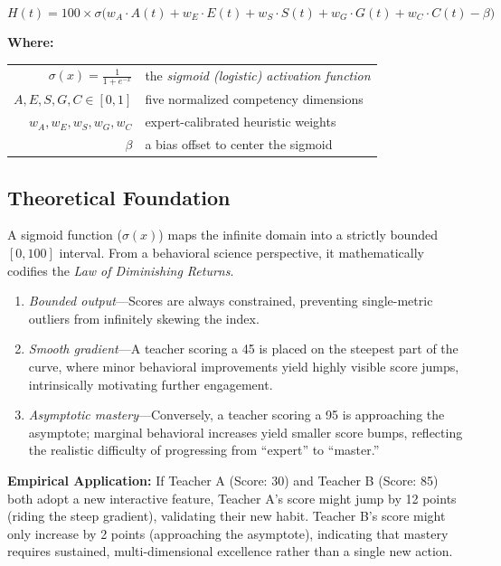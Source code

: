 \documentclass[11pt,a4paper]{article}
\begin{document}
\begin{equation}
    H(t) = 100 \times \sigma\bigl(w_A \cdot A(t) + w_E \cdot E(t) + w_S \cdot S(t) + w_G \cdot G(t) + w_C \cdot C(t) - \beta\bigr)
\end{equation}

\noindent \textbf{Where:}

\vspace{0.25em}
\noindent
\begin{tabular}{@{} r p{11cm} @{}}
    $\sigma(x) = \frac{1}{1 + e^{-x}}$ & the \textit{sigmoid (logistic) activation function} \\
    $A, E, S, G, C \in [0, 1]$ & five normalized competency dimensions \\
    $w_A, w_E, w_S, w_G, w_C$ & expert-calibrated heuristic weights \\
    $\beta$ & a bias offset to center the sigmoid \\
\end{tabular}

\subsection{Theoretical Foundation}

A sigmoid function ($\sigma(x)$) maps the infinite domain into a strictly bounded $[0, 100]$ interval. From a behavioral science perspective, it mathematically codifies the \textit{Law of Diminishing Returns}. 
\begin{enumerate}
    \item \textit{Bounded output}---Scores are always constrained, preventing single-metric outliers from infinitely skewing the index.
    \item \textit{Smooth gradient}---A teacher scoring a 45 is placed on the steepest part of the curve, where minor behavioral improvements yield highly visible score jumps, intrinsically motivating further engagement.
    \item \textit{Asymptotic mastery}---Conversely, a teacher scoring a 95 is approaching the asymptote; marginal behavioral increases yield smaller score bumps, reflecting the realistic difficulty of progressing from ``expert'' to ``master.''
\end{enumerate}

\textbf{Empirical Application:}
If Teacher A (Score: 30) and Teacher B (Score: 85) both adopt a new interactive feature, Teacher A's score might jump by 12 points (riding the steep gradient), validating their new habit. Teacher B's score might only increase by 2 points (approaching the asymptote), indicating that mastery requires sustained, multi-dimensional excellence rather than a single new action.
\end{document}
